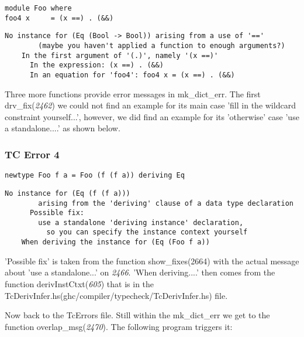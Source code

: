 \documentclass[a4paper]{article}
\begin{document}
\begin{lstlisting}[label={lst: T17.0}, numbers=none, caption={Example Program \cite{ex17}}]
module Foo where
foo4 x     = (x ==) . (&&) 
\end{lstlisting}


\begin{lstlisting}[label={lst: T17.0.2}, numbers=none, caption={Error}]
    No instance for (Eq (Bool -> Bool)) arising from a use of '=='
        (maybe you haven't applied a function to enough arguments?)
    In the first argument of '(.)', namely '(x ==)'
      In the expression: (x ==) . (&&)
      In an equation for 'foo4': foo4 x = (x ==) . (&&)
\end{lstlisting}

Three more functions provide error messages in  mk\_dict\_err. The first drv\_fix(\textit{2462}) we could not find an example for its main case 'fill in the wildcard constraint yourself...', however, we did find an example for its 'otherwise' case 'use a standalone....' as shown below.

\subsubsection{TC Error 4}

\begin{lstlisting}[label={lst: T18.0}, numbers=none, caption={Example Program \cite{ex18}}]
newtype Foo f a = Foo (f (f a)) deriving Eq
\end{lstlisting}

\begin{lstlisting}[label={lst: T18.0.2}, numbers=none, caption={Error}]
No instance for (Eq (f (f a)))
        arising from the 'deriving' clause of a data type declaration
      Possible fix:
        use a standalone 'deriving instance' declaration,
          so you can specify the instance context yourself
    When deriving the instance for (Eq (Foo f a))
\end{lstlisting}

'Possible fix' is taken from the function show\_fixes(2664) with the actual message about 'use a standalone...' on \textit{2466}. 'When deriving....' then comes from the function derivInstCtxt(\textit{605}) that is in the TcDerivInfer.hs(ghc/compiler/typecheck/TcDerivInfer.hs) file.


Now back to the TcErrors file. Still within the mk\_dict\_err we get to the function overlap\_msg(\textit{2470}). The following program triggers it:
\end{document}
